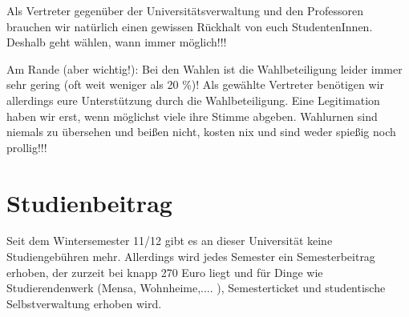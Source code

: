 Als Vertreter gegenüber der Universitätsverwaltung und den Professoren brauchen wir natürlich einen gewissen Rückhalt von euch StudentenInnen. Deshalb geht wählen, wann immer möglich!!!

Am Rande (aber wichtig!): Bei den Wahlen ist die Wahlbeteiligung leider immer sehr gering (oft weit weniger als 20 \%)! Als gewählte Vertreter benötigen wir allerdings eure Unterstützung durch die Wahlbeteiligung. Eine Legitimation haben wir erst, wenn möglichst viele ihre Stimme abgeben. Wahlurnen sind niemals zu übersehen und beißen nicht, kosten nix und sind weder spießig noch prollig!!!

\section*{Studienbeitrag}
Seit dem Wintersemester 11/12 gibt es an dieser Universität keine Studiengebühren mehr.
Allerdings wird jedes Semester ein Semesterbeitrag erhoben, der zurzeit bei knapp 270 Euro liegt und für Dinge wie Studierendenwerk (Mensa, Wohnheime,.... ), Semesterticket und studentische Selbstverwaltung erhoben wird.
